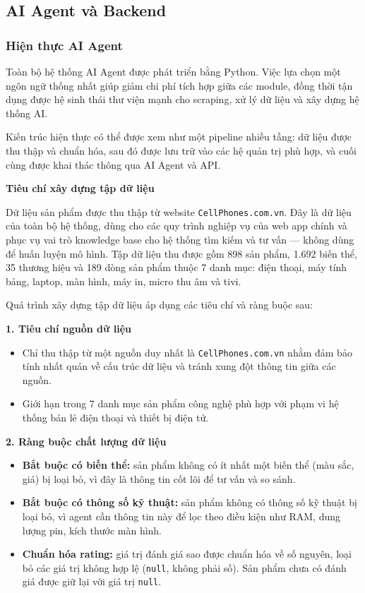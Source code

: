 \subsection{AI Agent và Backend}

\subsubsection{Hiện thực AI Agent}

Toàn bộ hệ thống AI Agent được phát triển bằng Python. Việc lựa chọn một ngôn ngữ thống nhất giúp giảm chi phí tích hợp giữa các module, đồng thời tận dụng được hệ sinh thái thư viện mạnh cho scraping, xử lý dữ liệu và xây dựng hệ thống AI.

Kiến trúc hiện thực có thể được xem như một pipeline nhiều tầng: dữ liệu được thu thập và chuẩn hóa, sau đó được lưu trữ vào các hệ quản trị phù hợp, và cuối cùng được khai thác thông qua AI Agent và API.

\textbf{Tiêu chí xây dựng tập dữ liệu}

Dữ liệu sản phẩm được thu thập từ website \texttt{CellPhones.com.vn}\cite{cellphones-data}. Đây là dữ liệu của toàn bộ hệ thống, dùng cho các quy trình nghiệp vụ của web app chính và phục vụ vai trò knowledge base cho hệ thống tìm kiếm và tư vấn --- không dùng để huấn luyện mô hình. Tập dữ liệu thu được gồm 898 sản phẩm, 1.692 biến thể, 35 thương hiệu và 189 dòng sản phẩm thuộc 7 danh mục: điện thoại, máy tính bảng, laptop, màn hình, máy in, micro thu âm và tivi.

Quá trình xây dựng tập dữ liệu áp dụng các tiêu chí và ràng buộc sau:

\textbf{1. Tiêu chí nguồn dữ liệu}

\begin{itemize}
    \item Chỉ thu thập từ một nguồn duy nhất là \texttt{CellPhones.com.vn} nhằm đảm bảo tính nhất quán về cấu trúc dữ liệu và tránh xung đột thông tin giữa các nguồn.
    \item Giới hạn trong 7 danh mục sản phẩm công nghệ phù hợp với phạm vi hệ thống bán lẻ điện thoại và thiết bị điện tử.
\end{itemize}

\textbf{2. Ràng buộc chất lượng dữ liệu}

\begin{itemize}
    \item \textbf{Bắt buộc có biến thể:} sản phẩm không có ít nhất một biến thể (màu sắc, giá) bị loại bỏ, vì đây là thông tin cốt lõi để tư vấn và so sánh.
    \item \textbf{Bắt buộc có thông số kỹ thuật:} sản phẩm không có thông số kỹ thuật bị loại bỏ, vì agent cần thông tin này để lọc theo điều kiện như RAM, dung lượng pin, kích thước màn hình.
    \item \textbf{Chuẩn hóa rating:} giá trị đánh giá sao được chuẩn hóa về số nguyên, loại bỏ các giá trị không hợp lệ (\texttt{null}, không phải số). Sản phẩm chưa có đánh giá được giữ lại với giá trị \texttt{null}.
\end{itemize}


